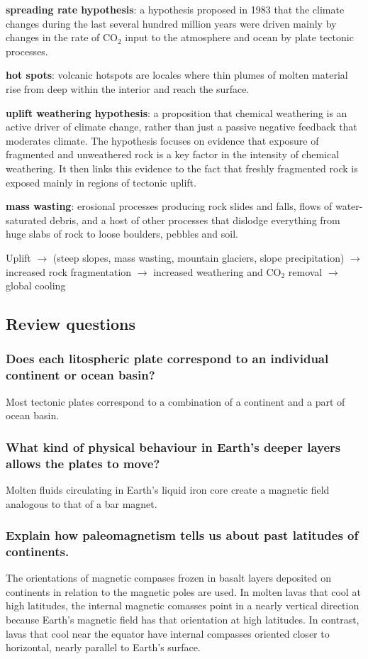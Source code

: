 \textbf{spreading rate hypothesis}: a hypothesis proposed in 1983 that the
climate changes during the last several hundred million years were driven
mainly by changes in the rate of CO$_2$ input to the atmosphere and ocean by
plate tectonic processes.

\textbf{hot spots}: volcanic hotspots are locales where thin plumes of molten
material rise from deep within the interior and reach the surface.

\textbf{uplift weathering hypothesis}: a proposition that chemical weathering
is an active driver of climate change, rather than just a passive negative
feedback that moderates climate. The hypothesis focuses on evidence that
exposure of fragmented and unweathered rock is a key factor in the intensity
of chemical weathering. It then links this evidence to the fact that freshly
fragmented rock is exposed mainly in regions of tectonic uplift.

\textbf{mass wasting}: erosional processes producing rock slides and falls,
flows of water-saturated debris, and a host of other processes that dislodge
everything from huge slabs of rock to loose boulders, pebbles and soil.

Uplift $\rightarrow$ (steep slopes, mass wasting, mountain glaciers, slope
precipitation) $\rightarrow$ increased rock fragmentation $\rightarrow$
increased weathering and CO$_2$ removal $\rightarrow$ global cooling

\subsection{Review questions}

\subsubsection{Does each litospheric plate correspond to an individual
continent or ocean basin?}
Most tectonic plates correspond to a combination of a continent and a part of
ocean basin.

\subsubsection{What kind of physical behaviour in Earth's deeper layers allows
the plates to move?}
Molten fluids circulating in Earth's liquid iron core create a magnetic field
analogous to that of a bar magnet.

\subsubsection{Explain how paleomagnetism tells us about past latitudes of
continents.}
The orientations of magnetic compases frozen in basalt layers deposited on
continents in relation to the magnetic poles are used. In molten lavas that
cool at high latitudes, the internal magnetic comasses point in a nearly
vertical direction because Earth's magnetic field has that orientation at high
latitudes. In contrast, lavas that cool near the equator have internal
compasses oriented closer to horizontal, nearly parallel to Earth's surface.

